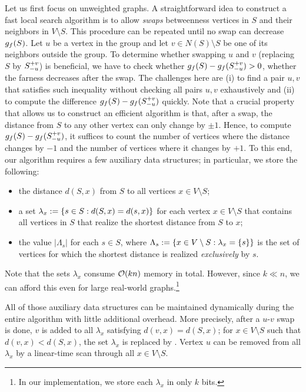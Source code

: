Let us first focus on unweighted graphs. A straightforward idea to construct a
fast local search algorithm is to allow \emph{swaps} betweenness vertices in $S$
and their neighbors in $V \setminus S$. This procedure can be repeated until no
swap can decrease $g_f(S)$. Let $u$ be a vertex in the group and let $v \in
N(S)\setminus S$ be one of its neighbors outside the group. To determine whether
swapping $u$ and $v$ (\ie replacing $S$ by $S_{-u}^{+v}$) is beneficial, we have to
check whether $g_f(S) - g_f(S_{-u}^{+v}) > 0$, \ie whether the farness decreases
after the swap. The challenges here are (i) to find a pair $u, v$ that satisfies such
inequality without checking all pairs $u, v$ exhaustively and (ii) to compute
the difference $g_f(S) - g_f(S_{-u}^{+v})$ quickly.
%
Note that a crucial property that allows us to construct an efficient algorithm
is that, after a swap, the distance from $S$ to any other vertex can only
change by $\pm1$. Hence, to compute $g_f(S) - g_f(S_{-u}^{+v})$, it suffices to
count the number of vertices where the distance changes by $-1$ and the number
of vertices where it changes by $+1$.
To this end, our algorithm requires a few auxiliary data structures; in
particular, we store the following:
\begin{itemize}
    \item the distance $d(S, x)$ from $S$ to all vertices $x \in V \setminus S$;
    \item a set $\lambda_x := \set{s \in S : d(S, x) = d(s, x)}$ for each
        vertex $x\in V\setminus S$ that contains all vertices in $S$ that
        realize the shortest distance from $S$ to $x$;
    \item the value $|\Lambda_s|$ for each $s\in S$, where
        $\Lambda_s := \set{x \in V\setminus S : \lambda_x = \set{s}}$ is the
        set of vertices for which the shortest distance is realized
        \emph{exclusively} by $s$.
\end{itemize}

Note that the sets $\lambda_x$ consume $\mathcal{O}(kn)$ memory in total. However,
since $k \ll n$, we can afford this even for large real-world
graphs.\footnote{In our implementation, we store each $\lambda_x$ in only
$k$ bits.}

All of those auxiliary data structures can be maintained dynamically during
the entire algorithm with little additional overhead. More precisely,
after a $u$-$v$ swap is done, $v$ is added to all $\lambda_x$ satisfying
$d(v, x) = d(S, x)$; for $x \in V \setminus S$ such that $d(v, x) < d(S, x)$,
the set $\lambda_x$ is replaced by . Vertex $u$ can be removed from all
$\lambda_x$ by a linear-time scan through all $x \in V \setminus S$.

